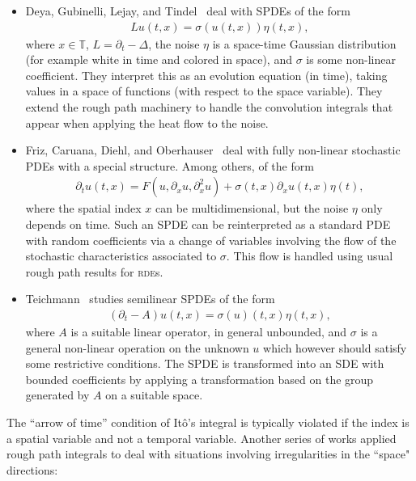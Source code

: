 \documentclass[a4paper,11pt]{article}
\theoremstyle{remark}
\begin{document}
\begin{itemize}
\item[--]
Deya, Gubinelli, Lejay, and Tindel~\cite{Gubinelli2006,Gubinelli2012a,Deya2012} deal with SPDEs of the form
\begin{align*}
   L u (t, x) = \sigma ( u ( t, x ) ) \eta ( t,x),
\end{align*}
where $x \in \mathbb{T}$, $L = \partial_t - \Delta$, the noise $\eta$ is a space-time Gaussian distribution (for example white in time and colored in space), and $\sigma$ is some non-linear coefficient. They interpret this as an evolution equation (in time), taking values in a space of functions (with respect to the space variable). They extend the rough path machinery to handle the convolution integrals that appear when applying the heat flow to the noise.

\item[--]
Friz, Caruana, Diehl, and Oberhauser~\cite{Caruana2009,Caruana2011,Friz2011b,Diehl2012} deal with fully non-linear stochastic PDEs with a special structure. Among others, of the form
\begin{align*}
   \partial_t u ( t, x ) = F ( u, \partial_{x} u, \partial_{x}^2 u) + \sigma( t, x) \partial_{x} u( t, x) \eta(t),
\end{align*}
where the spatial index $x$ can be multidimensional, but the noise $\eta$ only depends on time. Such an SPDE can be reinterpreted as a standard PDE with random coefficients via a change of variables involving the flow of the stochastic characteristics associated to $\sigma$. This flow is handled using usual rough path results for \textsc{rde}s.

\item[--]
Teichmann~\cite{Teichmann2011} studies semilinear SPDEs of the form
\begin{align*}
   (\partial_t - A) u(t,x) = \sigma(u)(t,x) \eta(t,x),
\end{align*}
where $A$ is a suitable linear operator, in general unbounded, and $\sigma$ is a general non-linear operation on the unknown $u$ which however should satisfy some restrictive conditions. The SPDE is transformed into an SDE with bounded coefficients by applying a  transformation based on the group generated by $A$ on a suitable space.
\end{itemize}

The ``arrow of time'' condition of It\^o's integral is typically violated if the index is a spatial variable and not a temporal variable. Another series of works applied rough path integrals to deal with situations involving irregularities in the ``space" directions:
\end{document}
